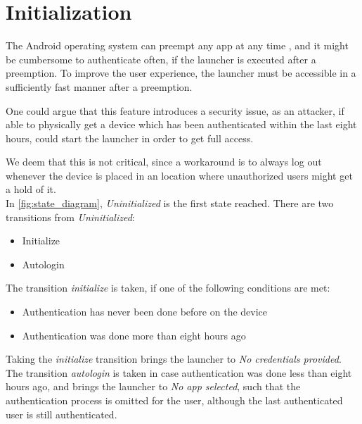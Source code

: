 \section{Initialization}
\label{design:initialization}
The Android operating system can preempt any app at any time \citep{android:activity}, and it might be cumbersome to authenticate often, if the \giraf[] launcher is executed after a preemption. 
To improve the user experience, the launcher must be accessible in a sufficiently fast manner after a preemption.

One could argue that this feature introduces a security issue, as an attacker, if able to physically get a device which has been authenticated within the last eight hours, could start the launcher in order to get full access.

We deem that this is not critical, since a workaround is to always log out whenever the device is placed in an location where unauthorized users might get a hold of it.\\

In \autoref{fig:state_diagram}, \emph{Uninitialized} is the first state reached. 
There are two transitions from \emph{Uninitialized}:

\begin{itemize}
	\item Initialize
	\item Autologin
\end{itemize}

The transition \emph{initialize} is taken, if one of the following conditions are met: 

\begin{itemize}
	\item Authentication has never been done before on the device
	\item Authentication was done more than eight hours ago
\end{itemize}

Taking the \emph{initialize} transition brings the launcher to \emph{No credentials provided}. \\

The transition \emph{autologin} is taken in case authentication was done less than eight hours ago, and brings the launcher to \emph{No app selected}, such that the authentication process is omitted for the user, although the last authenticated user is still authenticated.